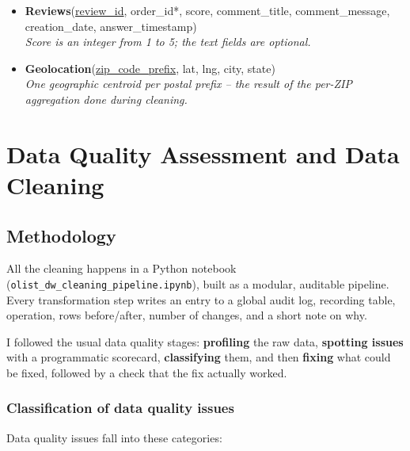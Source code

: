 \documentclass[12pt,a4paper]{article}
\begin{document}
\begin{itemize}
  \item \textbf{Reviews}(\underline{review\_id}, order\_id*, score, comment\_title,
        comment\_message, creation\_date, answer\_timestamp)\\
        \textit{Score is an integer from 1 to 5; the text fields are optional.}

  \item \textbf{Geolocation}(\underline{zip\_code\_prefix}, lat, lng, city, state)\\
        \textit{One geographic centroid per postal prefix -- the result of the per-ZIP
        aggregation done during cleaning.}
\end{itemize}

\section{Data Quality Assessment and Data Cleaning}

\subsection{Methodology}

All the cleaning happens in a Python notebook
(\texttt{olist\_dw\_cleaning\_pipeline.ipynb}), built as a modular, auditable
pipeline. Every transformation step writes an entry to a global audit log, recording
table, operation, rows before/after, number of changes, and a short note on why.

I followed the usual data quality stages: \textbf{profiling} the raw data,
\textbf{spotting issues} with a programmatic scorecard, \textbf{classifying} them, and
then \textbf{fixing} what could be fixed, followed by a check that the fix actually
worked.

\subsubsection*{Classification of data quality issues}

Data quality issues fall into these categories:
\end{document}

